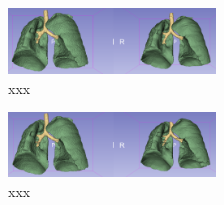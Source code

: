 \begin{figure}[h!]
	\includegraphics[width=0.49\textwidth, angle=0]{files/preddeepmedic.png}
	\caption{xxx}
	\label{scan_picture}
\end{figure}

\begin{figure}[h!]
	\includegraphics[width=0.49\textwidth, angle=0]{files/predunet.png}
	\caption{xxx}
	\label{scan_picture}
\end{figure}